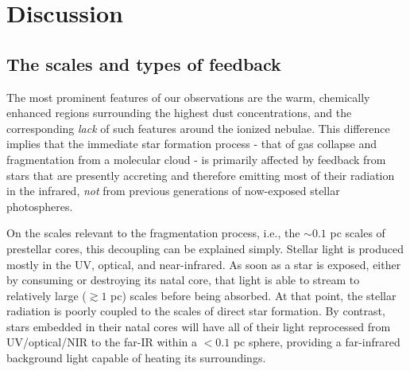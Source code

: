 \documentclass{aa}
\begin{document}
%
%



\section{Discussion}
\label{sec:discussion}
\subsection{The scales and types of feedback}
\label{sec:feedbackscales}
The most prominent features of our observations are the warm, chemically
enhanced regions surrounding the highest dust concentrations, and the
corresponding \emph{lack} of such features around the ionized nebulae.  This
difference implies that the immediate star formation process - that of gas
collapse and fragmentation from a molecular cloud - is primarily affected by
feedback from stars that are presently accreting and therefore emitting most of
their radiation in the infrared, \emph{not} from previous generations of
now-exposed stellar photospheres.

On the scales relevant to the fragmentation process, i.e., the $\sim0.1$ pc
scales of prestellar cores, this decoupling can be explained simply.  Stellar
light is produced mostly in the UV, optical, and near-infrared.  As soon as a
star is exposed, either by consuming or destroying its natal core, that light
is able to stream to relatively large ($\gtrsim1$ pc) scales before being
absorbed.  At that point, the stellar radiation is poorly coupled to the scales
of direct star formation.  By contrast, stars embedded in their natal cores
will have all of their light reprocessed from UV/optical/NIR to the far-IR
within a $<0.1$ pc sphere, providing a far-infrared background light capable of
heating its surroundings.
\end{document}
